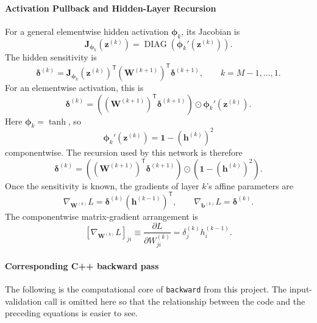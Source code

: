 \documentclass{article}
\begin{document}
\paragraph{Activation Pullback and Hidden-Layer Recursion}
For a general elementwise hidden activation
\(\boldsymbol{\phi}_k\), its Jacobian is
\[
  \mathbf{J}_{\boldsymbol{\phi}_k}(\mathbf{z}^{(k)})
  =
  \operatorname{DIAG}
  \left(
    \boldsymbol{\phi}_k'(\mathbf{z}^{(k)})
  \right).
\]
The hidden sensitivity is
\[
  \boxed{
    \boldsymbol{\delta}^{(k)}
    =
    \mathbf{J}_{\boldsymbol{\phi}_k}(\mathbf{z}^{(k)})^\mathsf{T}
    (\mathbf{W}^{(k+1)})^\mathsf{T}
    \boldsymbol{\delta}^{(k+1)},
    \qquad
    k=M-1,\ldots,1.
  }
\]
For an elementwise activation, this is
\[
  \boldsymbol{\delta}^{(k)}
  =
  \left(
    (\mathbf{W}^{(k+1)})^\mathsf{T}
    \boldsymbol{\delta}^{(k+1)}
  \right)
  \odot
  \boldsymbol{\phi}_k'(\mathbf{z}^{(k)}).
\]
Here \(\boldsymbol{\phi}_k=\tanh\), so
\[
  \boldsymbol{\phi}_k'(\mathbf{z}^{(k)})
  =
  \mathbf{1}-(\mathbf{h}^{(k)})^2
\]
componentwise. The recursion used by this network is therefore
\[
  \boxed{
    \boldsymbol{\delta}^{(k)}
    =
    \left(
      (\mathbf{W}^{(k+1)})^\mathsf{T}
      \boldsymbol{\delta}^{(k+1)}
    \right)
    \odot
    \left(
      \mathbf{1}-(\mathbf{h}^{(k)})^2
    \right).
  }
\]
Once the sensitivity is known, the gradients of layer \(k\)'s affine
parameters are
\[
  \boxed{
    \nabla_{\mathbf{W}^{(k)}}L
    =
    \boldsymbol{\delta}^{(k)}
    (\mathbf{h}^{(k-1)})^\mathsf{T},
    \qquad
    \nabla_{\mathbf{b}^{(k)}}L
    =
    \boldsymbol{\delta}^{(k)}.
  }
\]
The componentwise matrix-gradient arrangement is
\[
  \left[
    \nabla_{\mathbf{W}^{(k)}}L
  \right]_{ji}
  \equiv
  \frac{\partial L}{\partial W_{ji}^{(k)}}
  =
  \delta_j^{(k)}h_i^{(k-1)}.
\]

\paragraph{Corresponding C++ backward pass}
The following is the computational core of \texttt{backward} from this project. The input-validation call is omitted here so that the relationship between the code and the preceding equations is easier to see.
\end{document}
